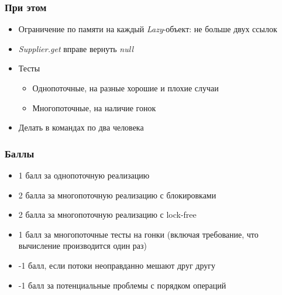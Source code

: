 \documentclass[xetex,mathserif,serif]{beamer}
\begin{document}
	\begin{frame}
		\frametitle{При этом}
		\begin{itemize}
			\item Ограничение по памяти на каждый \textit{Lazy}-объект: не больше двух ссылок
			\item \textit{Supplier.get} вправе вернуть \textit{null}
			\item Тесты
			\begin{itemize}
				\item Однопоточные, на разные хорошие и плохие случаи
				\item Многопоточные, на наличие гонок
			\end{itemize}
			\item Делать в командах по два человека
		\end{itemize}
	\end{frame}

	\begin{frame}
		\frametitle{Баллы}
		\begin{itemize}
			\item 1 балл за однопоточную реализацию
			\item 2 балла за многопоточную реализацию с блокировками
			\item 2 балла за многопоточную реализацию с lock-free
			\item 1 балл за многопоточные тесты на гонки (включая требование, что вычисление производится один раз)
			\item -1 балл, если потоки неоправданно мешают друг другу
			\item -1 балл за потенциальные проблемы с порядком операций
		\end{itemize}
	\end{frame}
\end{document}
